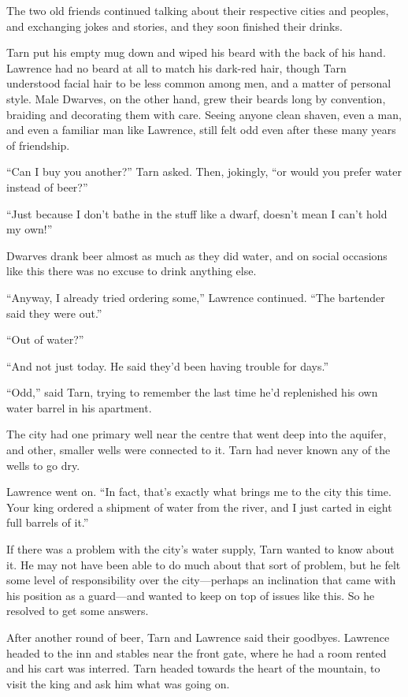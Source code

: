 The two old friends continued talking about their respective cities and peoples, and exchanging jokes and stories, and they soon finished their drinks.

Tarn put his empty mug down and wiped his beard with the back of his hand.  Lawrence had no beard at all to match his dark-red hair, though Tarn understood facial hair to be less common among men, and a matter of personal style.  Male Dwarves, on the other hand, grew their beards long by convention, braiding and decorating them with care.  Seeing anyone clean shaven, even a man, and even a familiar man like Lawrence, still felt odd even after these many years of friendship.

``Can I buy you another?'' Tarn asked.  Then, jokingly, ``or would you prefer water instead of beer?''

``Just because I don't bathe in the stuff like a dwarf, doesn't mean I can't hold my own!''

Dwarves drank beer almost as much as they did water, and on social occasions like this there was no excuse to drink anything else.

``Anyway, I already tried ordering some,'' Lawrence continued.  ``The bartender said they were out.''

``Out of water?''

``And not just today.  He said they'd been having trouble for days.''

``Odd,'' said Tarn, trying to remember the last time he'd replenished his own water barrel in his apartment.

The city had one primary well near the centre that went deep into the aquifer, and other, smaller wells were connected to it.  Tarn had never known any of the wells to go dry.

Lawrence went on.  ``In fact, that's exactly what brings me to the city this time.  Your king ordered a shipment of water from the river, and I just carted in eight full barrels of it.''

If there was a problem with the city's water supply, Tarn wanted to know about it.  He may not have been able to do much about that sort of problem, but he felt some level of responsibility over the city---perhaps an inclination that came with his position as a guard---and wanted to keep on top of issues like this.  So he resolved to get some answers.

After another round of beer, Tarn and Lawrence said their goodbyes. Lawrence headed to the inn and stables near the front gate, where he had a room rented and his cart was interred.  Tarn headed towards the heart of the mountain, to visit the king and ask him what was going on.

